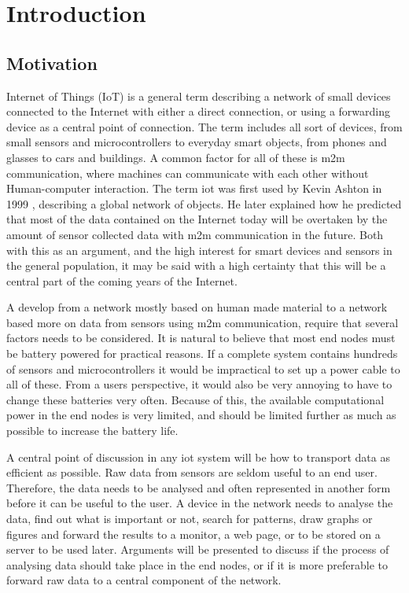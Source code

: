 \chapter{Introduction}
\label{chp:introduction} 


\section{Motivation}

\noindent Internet of Things (IoT) is a general term describing a network of small devices connected to the Internet with either a direct connection, or using a forwarding device as a central point of connection. The term includes all sort of devices, from small sensors and microcontrollers to everyday smart objects, from phones and glasses to cars and buildings. A common factor for all of these is \gls{m2m} communication, where machines can communicate with each other without Human-computer interaction. The term \gls{iot} was first used by Kevin Ashton in 1999 \cite{ashton2009internet}, describing a global network of objects. He later explained how he predicted that most of the data contained on the Internet today will be overtaken by the amount of sensor collected data with \gls{m2m} communication in the future. Both with this as an argument, and the high interest for smart devices and sensors in the general population, it may be said with a high certainty that this will be a central part of the coming years of the Internet. 

\noindent A develop from a network mostly based on human made material to a network based more on data from sensors using \gls{m2m} communication, require that several factors needs to be considered. It is natural to believe that most end nodes must be battery powered for practical reasons. If a complete system contains hundreds of sensors and \glspl{microcontroller} it would be impractical to set up a power cable to all of these. From a users perspective, it would also be very annoying to have to change these batteries very often. Because of this, the available computational power in the end nodes is very limited, and should be limited further as much as possible to increase the battery life. 

\noindent A central point of discussion in any \gls{iot} system will be how to transport data as efficient as possible. Raw data from sensors are seldom useful to an end user. Therefore, the data needs to be analysed and often represented in another form before it can be useful to the user. A device in the network needs to analyse the data, find out what is important or not, search for patterns, draw graphs or figures and forward the results to a monitor, a web page, or to be stored on a server to be used later. Arguments will be presented to discuss if the process of analysing data should take place in the end nodes, or if it is more preferable to forward raw data to a central component of the network. 


